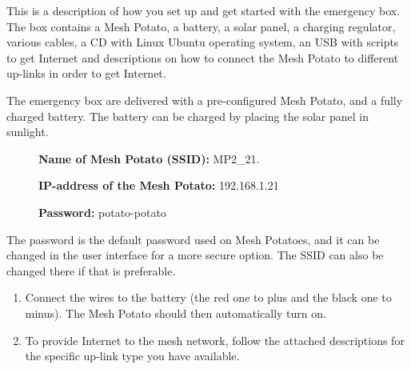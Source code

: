 This is a description of how you set up and get started with the emergency box. The box contains a Mesh Potato, a battery, a solar panel, a charging regulator, various cables, a CD with Linux Ubuntu operating system, an USB with scripts to get Internet and descriptions on how to connect the Mesh Potato to different up-links in order to get Internet. 

The emergency box are delivered with a pre-configured Mesh Potato, and a fully charged battery. The battery can be charged by placing the solar panel in sunlight. 

\begin{description}
\item[] \textbf{Name of Mesh Potato (SSID):} MP2_21.
\item[] \textbf{IP-address of the Mesh Potato:} 192.168.1.21
\item[] \textbf{Password:} potato-potato 
\end{description}

The password is the default password used on Mesh Potatoes, and it can be changed in the user interface for a more secure option. The SSID can also be changed there if that is preferable. 

\begin{enumerate}
\item Connect the wires to the battery (the red one to plus and the black one to minus). The Mesh Potato should then automatically turn on. 
\item To provide Internet to the mesh network, follow the attached descriptions for the specific up-link type you have available. 
\end{enumerate} 
